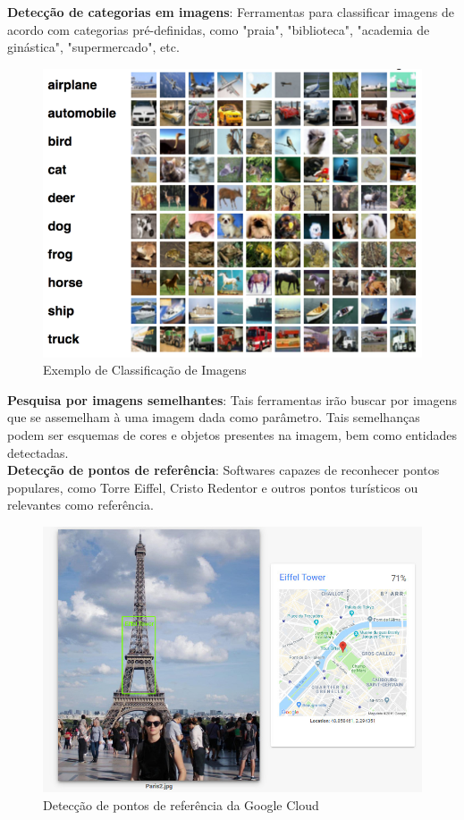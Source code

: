 \documentclass{article}
\begin{document}
\textbf{Detecção de categorias em imagens}: Ferramentas para classificar imagens de acordo com categorias pré-definidas, como "praia", "biblioteca", "academia de ginástica", "supermercado", etc.\\
\begin{figure}[H]
    \centering
    \includegraphics[scale=0.3]{imagens/classificacao_imagens.png}
    \caption{Exemplo de Classificação de Imagens}
    \label{fig:classificação_imagens}
\end{figure}{}
\textbf{Pesquisa por imagens semelhantes}: Tais ferramentas irão buscar por imagens que se assemelham à uma imagem dada como parâmetro. Tais semelhanças podem ser esquemas de cores e objetos presentes na imagem, bem como entidades detectadas. \\
\textbf{Detecção de pontos de referência}: Softwares capazes de reconhecer pontos populares, como Torre Eiffel, Cristo Redentor e outros pontos turísticos ou relevantes como referência.\\
\begin{figure}[H]
    \centering
    \includegraphics[scale=0.3]{imagens/Paris2.jpg}
    \caption{Detecção de pontos de referência da Google Cloud}
    \label{fig:ponto_turistico}
\end{figure}{}
\end{document}
